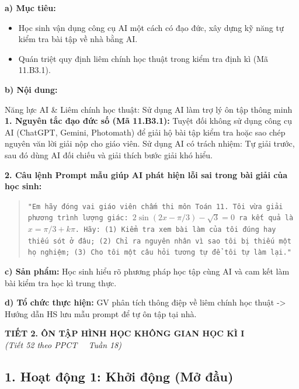 \documentclass[12pt, a4paper]{article}
\begin{document}
\noindent \textbf{a) Mục tiêu:}
\begin{itemize}
    \item Học sinh vận dụng công cụ AI một cách có đạo đức, xây dựng kỹ năng tự kiểm tra bài tập về nhà bằng AI.
    \item Quán triệt quy định liêm chính học thuật trong kiểm tra định kì (Mã 11.B3.1).
\end{itemize}

\noindent \textbf{b) Nội dung:}
\begin{aibox}{Năng lực AI & Liêm chính học thuật: Sử dụng AI làm trợ lý ôn tập thông minh}
    \textbf{1. Nguyên tắc đạo đức số (Mã 11.B3.1):}
    Tuyệt đối không sử dụng công cụ AI (ChatGPT, Gemini, Photomath) để giải hộ bài tập kiểm tra hoặc sao chép nguyên văn lời giải nộp cho giáo viên. Sử dụng AI có trách nhiệm: Tự giải trước, sau đó dùng AI đối chiếu và giải thích bước giải khó hiểu.
    
    \textbf{2. Câu lệnh Prompt mẫu giúp AI phát hiện lỗi sai trong bài giải của học sinh:}
    \begin{quote}
        \small \texttt{"Em hãy đóng vai giáo viên chấm thi môn Toán 11. Tôi vừa giải phương trình lượng giác: $2\sin(2x - \pi/3) - \sqrt{3} = 0$ ra kết quả là $x = \pi/3 + k\pi$. Hãy: (1) Kiểm tra xem bài làm của tôi đúng hay thiếu sót ở đâu; (2) Chỉ ra nguyên nhân vì sao tôi bị thiếu một họ nghiệm; (3) Cho tôi một câu hỏi tương tự để tôi tự làm lại."}
    \end{quote}
\end{aibox}

\noindent \textbf{c) Sản phẩm:}
Học sinh hiểu rõ phương pháp học tập cùng AI và cam kết làm bài kiểm tra học kì trung thực.

\noindent \textbf{d) Tổ chức thực hiện:}
GV phân tích thông điệp về liêm chính học thuật -> Hướng dẫn HS lưu mẫu prompt để tự ôn tập tại nhà.

\vspace{10pt}
\begin{center}
    {\fontsize{13pt}{16pt}\selectfont \textbf{TIẾT 2. ÔN TẬP HÌNH HỌC KHÔNG GIAN HỌC KÌ I}}\\[2pt]
    \textit{(Tiết 52 theo PPCT \ \textbar \ Tuần 18)}
\end{center}

\subsection*{1. Hoạt động 1: Khởi động (Mở đầu)}
\end{document}
